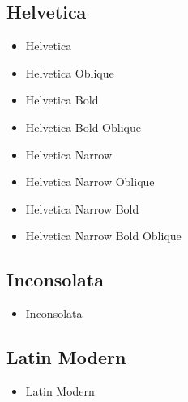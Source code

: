    \subsection{Helvetica}
    \begin{itemize}
        \item {\selectfont Helvetica}
        \item {\selectfont Helvetica Oblique}

        \item {\selectfont Helvetica Bold}
        \item {\selectfont Helvetica Bold Oblique}

        \item {\selectfont Helvetica Narrow}
        \item {\selectfont Helvetica Narrow Oblique}

        \item {\selectfont Helvetica Narrow Bold}
        \item {\selectfont Helvetica Narrow Bold
 Oblique}
    \end{itemize}


    \subsection{Inconsolata}
    \begin{itemize}
    \item {\selectfont Inconsolata}
    \end{itemize}


    \subsection{Latin Modern}
    \begin{itemize}
    \item {\selectfont Latin Modern}
    \end{itemize}

